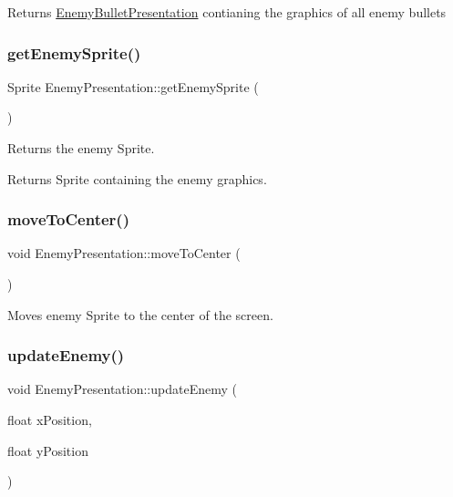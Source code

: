 \begin{DoxyReturn}{Returns}
\hyperlink{class_enemy_bullet_presentation}{Enemy\+Bullet\+Presentation} contianing the graphics of all enemy bullets 
\end{DoxyReturn}
\mbox{\label{class_enemy_presentation_a9b88f3f215f5f94028f732005c68daa9}} 
\subsubsection{\texorpdfstring{get\+Enemy\+Sprite()}{getEnemySprite()}}
{\footnotesize\ttfamily Sprite Enemy\+Presentation\+::get\+Enemy\+Sprite (\begin{DoxyParamCaption}{ }\end{DoxyParamCaption})}



Returns the enemy Sprite. 

\begin{DoxyReturn}{Returns}
Sprite containing the enemy graphics. 
\end{DoxyReturn}
\mbox{\label{class_enemy_presentation_a8e6b10042366b1af3ddd99878cae36a9}} 
\subsubsection{\texorpdfstring{move\+To\+Center()}{moveToCenter()}}
{\footnotesize\ttfamily void Enemy\+Presentation\+::move\+To\+Center (\begin{DoxyParamCaption}{ }\end{DoxyParamCaption})}



Moves enemy Sprite to the center of the screen. 

\mbox{\label{class_enemy_presentation_adc38a8f56b24ec4aea9157dd74884b40}} 
\subsubsection{\texorpdfstring{update\+Enemy()}{updateEnemy()}}
{\footnotesize\ttfamily void Enemy\+Presentation\+::update\+Enemy (\begin{DoxyParamCaption}\item[{float}]{x\+Position,  }\item[{float}]{y\+Position }\end{DoxyParamCaption})}



